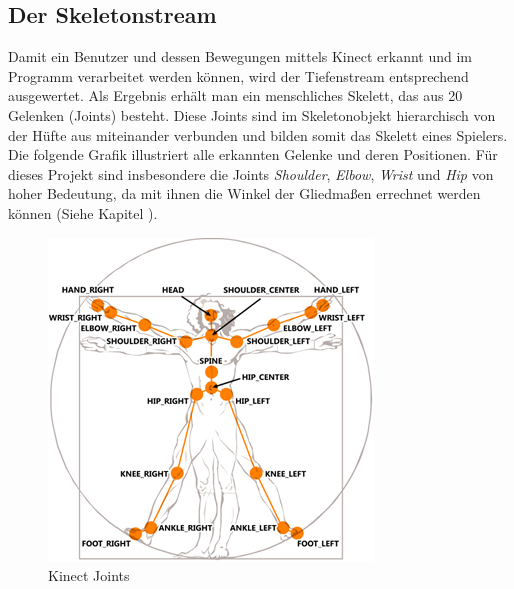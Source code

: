 \subsection{Der Skeletonstream}\label{skeleton}
Damit ein Benutzer und dessen Bewegungen mittels Kinect erkannt und im Programm verarbeitet werden können, wird der Tiefenstream entsprechend ausgewertet. Als Ergebnis erhält man ein menschliches Skelett, das aus
20 Gelenken (Joints) besteht. Diese Joints sind im Skeletonobjekt hierarchisch von der Hüfte aus miteinander verbunden und bilden somit das Skelett eines Spielers. Die folgende Grafik illustriert alle erkannten Gelenke und deren Positionen. Für dieses Projekt sind insbesondere die Joints \textit{Shoulder}, \textit{Elbow}, \textit{Wrist} und \textit{Hip} von hoher Bedeutung, da mit ihnen die Winkel der Gliedmaßen errechnet werden können (Siehe Kapitel ).

\begin{figure}[H]						
	\centering							
	\includegraphics[scale=1.0]{Bilder/kinect_joints.png}			
	\caption{Kinect Joints \cite{ws:microsoft_jointType}}						
	\label{f:kinect_joints}						
\end{figure}


